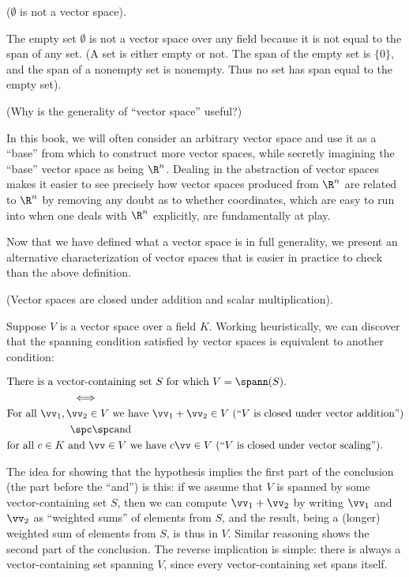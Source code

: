 \begin{remark}
    ($\emptyset$ is not a vector space).
    
    The empty set $\emptyset$ is not a vector space over any field because it is not equal to the span of any set. (A set is either empty or not. The span of the empty set is $\{0\}$, and the span of a nonempty set is nonempty. Thus no set has span equal to the empty set).
\end{remark}

\begin{remark}
    (Why is the generality of ``vector space'' useful?)
    
    In this book, we will often consider an arbitrary vector space and use it as a ``base'' from which to construct more vector spaces, while secretly imagining the ``base'' vector space as being $\R^n$. Dealing in the abstraction of vector spaces makes it easier to see precisely how vector spaces produced from $\R^n$ are related to $\R^n$ by removing any doubt as to whether coordinates, which are easy to run into when one deals with $\R^n$ explicitly, are fundamentally at play.
\end{remark}

Now that we have defined what a vector space is in full generality, we present an alternative characterization of vector spaces that is easier in practice to check than the above definition. 

\begin{deriv}
    (Vector spaces are closed under addition and scalar multiplication).
    
    Suppose $V$ is a vector space over a field $K$. Working heuristically, we can discover that the spanning condition satisfied by vector spaces is equivalent to another condition:
    
    \begin{align*}
        &\text{There is a vector-containing set $S$ for which $V = \spann(S)$.} \\
        &\quad \quad \quad \quad \quad \quad \iff \\
        &\text{For all $\vv_1, \vv_2 \in V$ we have $\vv_1 + \vv_2 \in V$ (``$V$ is closed under vector addition'')} \\
        &\quad \quad \quad \quad \quad \quad \spc \spc \text{and} \\
        &\text{for all $c \in K$ and $\vv \in V$ we have $c \vv \in V$ (``$V$ is closed under vector scaling'')}.
    \end{align*}
    
    The idea for showing that the hypothesis implies the first part of the conclusion (the part before the ``and'') is this: if we assume that $V$ is spanned by some vector-containing set $S$, then we can compute $\vv_1 + \vv_2$ by writing $\vv_1$ and $\vv_2$ as ``weighted sums'' of elements from $S$, and the result, being a (longer) weighted sum of elements from $S$, is thus in $V$. Similar reasoning shows the second part of the conclusion. The reverse implication is simple: there is always a vector-containing set spanning $V$, since every vector-containing set spans itself.
\end{deriv}

